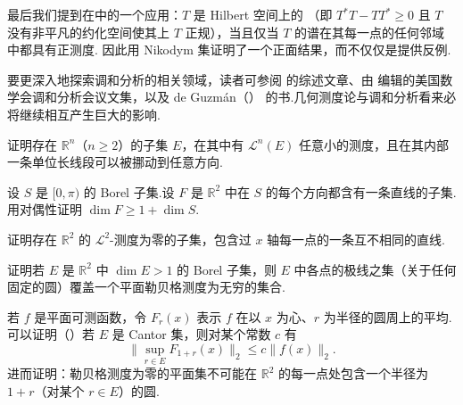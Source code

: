 最后我们提到在中的一个应用：$T$ 是 Hilbert 空间上的 （即 $T^{*}T-TT^{*}\geq 0$ 且 $T$ 没有非平凡的约化空间使其上 $T$ 正规），当且仅当 $T$ 的谱在其每一点的任何邻域中都具有正测度.\textcite{putnam1974} 因此用 Nikodym 集证明了一个正面结果，而不仅仅是提供反例.

要更深入地探索调和分析的相关领域，读者可参阅 \textcite{steinwainger1978} 的综述文章、由 \textcite{waingerweiss1979} 编辑的美国数学会调和分析会议文集，以及 de Guzmán（\citeyear{deguzman1975,deguzman1981}） 的书.几何测度论与调和分析看来必将继续相互产生巨大的影响.

\begin{exercises}
\item 证明存在 $\mathbb{R}^n$（$n\geq 2$）的子集 $E$，在其中有 $\mathscr{L}^n(E)$ 任意小的测度，且在其内部一条单位长线段可以被挪动到任意方向.
\item 设 $S$ 是 $[0,\pi)$ 的 Borel 子集.设 $F$ 是 $\mathbb{R}^2$ 中在 $S$ 的每个方向都含有一条直线的子集.用对偶性证明 $\dim F\geq 1+\dim S$.
\item 证明存在 $\mathbb{R}^2$ 的 $\mathscr{L}^2$-测度为零的子集，包含过 $x$ 轴每一点的一条互不相同的直线.
\item 证明若 $E$ 是 $\mathbb{R}^2$ 中 $\dim E>1$ 的 Borel 子集，则 $E$ 中各点的极线之集（关于任何固定的圆）覆盖一个平面勒贝格测度为无穷的集合.
\item 若 $f$ 是平面可测函数，令 $F_r(x)$ 表示 $f$ 在以 $x$ 为心、$r$ 为半径的圆周上的平均.可以证明（\citeyear{wainger1979}）若 $E$ 是 Cantor 集，则对某个常数 $c$ 有
\[
  \bigl\|\sup_{r\in E}F_{1+r}(x)\bigr\|_{2}\leq c\|f(x)\|_{2}.
\]
进而证明：勒贝格测度为零的平面集不可能在 $\mathbb{R}^2$ 的每一点处包含一个半径为 $1+r$（对某个 $r\in E$）的圆.
\end{exercises}
